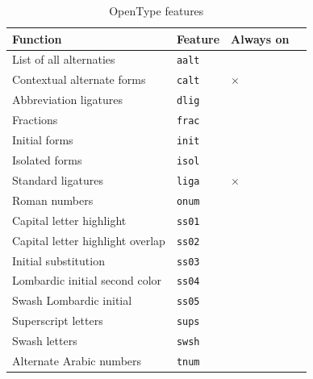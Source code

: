 \documentclass[a4paper]{article}
\newcommand{\feature}[1]{\texttt{#1}}
\begin{document}
\begin{table}
  \centering
  \begin{tabular}{llll}
    Function & Feature & Always on & \\
    \hline
    List of all alternaties & \feature{aalt} \\
    Contextual alternate forms & \feature{calt} & $\times$  \\
    Abbreviation ligatures & \feature{dlig}  \\
    Fractions & \feature{frac} \\
    Initial forms & \feature{init} \\
    Isolated forms & \feature{isol}  \\
    Standard ligatures & \feature{liga} & $\times$\\
    Roman numbers & \feature{onum} \\
    Capital letter highlight & \feature{ss01} & \\
    Capital letter highlight overlap & \feature{ss02} &\\
    Initial substitution & \feature{ss03} & & \\
    Lombardic initial second color & \feature{ss04} & \\
    Swash Lombardic initial & \feature{ss05} \\
    Superscript letters & \feature{sups} & \\
    Swash letters & \feature{swsh} &\\
    Alternate Arabic numbers & \feature{tnum} \\
  \end{tabular}
  \caption{OpenType features}
  \label{tab:opentype_features}
\end{table}
\end{document}
